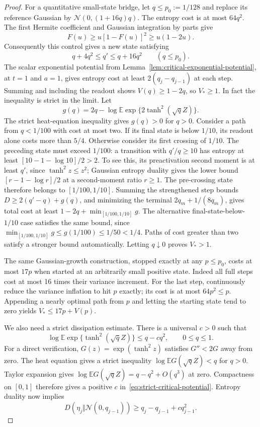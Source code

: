\begin{proof}
For a quantitative small-state bridge, let $q\le p_0:=1/128$ and
replace its reference Gaussian by
$\mathcal N(0,(1+16q)q)$. The entropy cost is at most $64q^2$.
The first Hermite coefficient
and Gaussian integration by parts give
\[
 F(u)\ge u[1-F(u)]^2\ge u(1-2u).
\]
Consequently this control gives a new state satisfying
\[
 q+4q^2\le q'\le q+16q^2\qquad(q\le p_0).
\]
The scalar exponential potential from
Lemma~\ref{lem:critical-exponential-potential}, at $t=1$ and $a=1$,
gives entropy cost at least $2(q_j-q_{j-1})$ at each step. Summing and
including the readout shows $V(q)\ge1-2q$, so $V_*\ge1$.
In fact the inequality is strict in the limit. Let
\[
 g(q)=2q-\log\mathbb E\exp\{2\tanh^2(\sqrt qZ)\}.
\]
The strict heat-equation inequality gives $g(q)>0$ for $q>0$.
Consider a path from $q<1/100$ with cost at most two. If its final
state is below $1/10$, its readout alone costs more than $5/4$.
Otherwise consider its first crossing of $1/10$.
The preceding state must exceed $1/100$: a transition with
$q'/q\ge10$ has entropy at least
$[10-1-\log10]/2>2$. To see this, its preactivation second moment
is at least $q'$, since $\tanh^2z\le z^2$; Gaussian entropy duality
gives the lower bound $[r-1-\log r]/2$ at a second-moment ratio $r\ge1$.
The pre-crossing state therefore belongs to $[1/100,1/10]$.
Summing the strengthened step bounds
$D\ge2(q'-q)+g(q)$, and minimizing the terminal
$2q_m+1/(8q_m)$, gives total cost at least
$1-2q+\min_{[1/100,1/10]}g$.
The alternative final-state-below-$1/10$ case satisfies the same bound,
since $\min_{[1/100,1/10]}g\le g(1/100)\le1/50<1/4$.
Paths of cost greater than two satisfy a stronger bound automatically.
Letting $q\downarrow0$ proves $V_*>1$.

The same Gaussian-growth construction, stopped exactly at any
$p\le p_0$, costs at most $17p$ when started at an arbitrarily small
positive state. Indeed all full steps cost at most 16 times their
variance increment. For the last step, continuously reduce the variance
inflation to hit $p$ exactly; its cost is at most $64p^2\le p$.
Appending a nearly optimal path from $p$ and letting the starting state
tend to zero yields $V_*\le17p+V(p)$.

We also need a strict dissipation estimate. There is a universal $c>0$
such that
\begin{equation}\label{eq:strict-critical-potential}
 \log\mathbb E\exp\{\tanh^2(\sqrt qZ)\}\le q-cq^2,
 \qquad 0\le q\le1.
\end{equation}
For a direct verification, $G(z)=\exp(\tanh^2z)$ satisfies $G''<2G$
away from zero. The heat equation gives a strict inequality
$\log\mathbb EG(\sqrt qZ)<q$ for $q>0$.
Taylor expansion gives
$\log\mathbb EG(\sqrt qZ)=q-q^2+O(q^3)$ at zero. Compactness on
$[0,1]$ therefore gives a positive $c$ in~\eqref{eq:strict-critical-potential}.
Entropy duality now implies
\begin{equation}\label{eq:scalar-step-dissipation}
 D(\eta_j\Vert\mathcal N(0,q_{j-1}))
 \ge q_j-q_{j-1}+cq_{j-1}^2.
\end{equation}


\end{proof}
